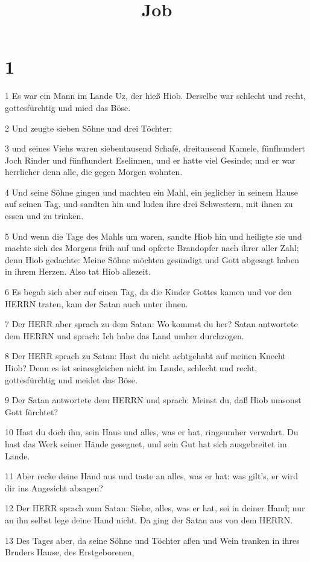 

\title{Job}


\chapter{1}

\par 1 Es war ein Mann im Lande Uz, der hieß Hiob. Derselbe war schlecht und recht, gottesfürchtig und mied das Böse.
\par 2 Und zeugte sieben Söhne und drei Töchter;
\par 3 und seines Viehs waren siebentausend Schafe, dreitausend Kamele, fünfhundert Joch Rinder und fünfhundert Eselinnen, und er hatte viel Gesinde; und er war herrlicher denn alle, die gegen Morgen wohnten.
\par 4 Und seine Söhne gingen und machten ein Mahl, ein jeglicher in seinem Hause auf seinen Tag, und sandten hin und luden ihre drei Schwestern, mit ihnen zu essen und zu trinken.
\par 5 Und wenn die Tage des Mahls um waren, sandte Hiob hin und heiligte sie und machte sich des Morgens früh auf und opferte Brandopfer nach ihrer aller Zahl; denn Hiob gedachte: Meine Söhne möchten gesündigt und Gott abgesagt haben in ihrem Herzen. Also tat Hiob allezeit.
\par 6 Es begab sich aber auf einen Tag, da die Kinder Gottes kamen und vor den HERRN traten, kam der Satan auch unter ihnen.
\par 7 Der HERR aber sprach zu dem Satan: Wo kommst du her? Satan antwortete dem HERRN und sprach: Ich habe das Land umher durchzogen.
\par 8 Der HERR sprach zu Satan: Hast du nicht achtgehabt auf meinen Knecht Hiob? Denn es ist seinesgleichen nicht im Lande, schlecht und recht, gottesfürchtig und meidet das Böse.
\par 9 Der Satan antwortete dem HERRN und sprach: Meinst du, daß Hiob umsonst Gott fürchtet?
\par 10 Hast du doch ihn, sein Haus und alles, was er hat, ringsumher verwahrt. Du hast das Werk seiner Hände gesegnet, und sein Gut hat sich ausgebreitet im Lande.
\par 11 Aber recke deine Hand aus und taste an alles, was er hat: was gilt's, er wird dir ins Angesicht absagen?
\par 12 Der HERR sprach zum Satan: Siehe, alles, was er hat, sei in deiner Hand; nur an ihn selbst lege deine Hand nicht. Da ging der Satan aus von dem HERRN.
\par 13 Des Tages aber, da seine Söhne und Töchter aßen und Wein tranken in ihres Bruders Hause, des Erstgeborenen,

